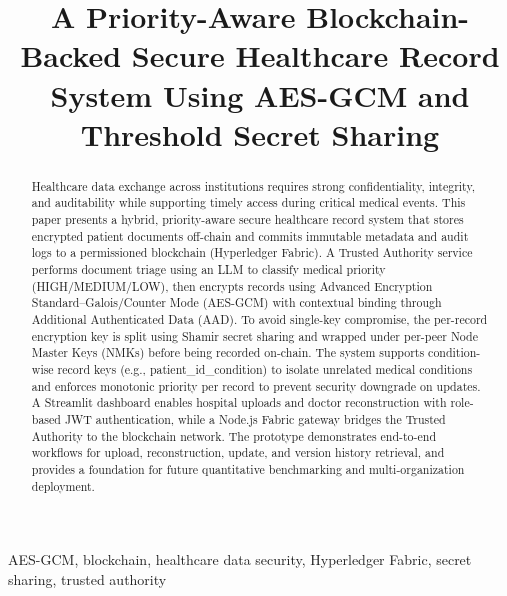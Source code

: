 \documentclass{IEEEtran}
\begin{document}
\title{A Priority-Aware Blockchain-Backed Secure Healthcare Record System Using AES-GCM and Threshold Secret Sharing}
\author{
}

\maketitle

\begin{abstract}
Healthcare data exchange across institutions requires strong confidentiality, integrity, and auditability while supporting timely access during critical medical events. This paper presents a hybrid, priority-aware secure healthcare record system that stores encrypted patient documents off-chain and commits immutable metadata and audit logs to a permissioned blockchain (Hyperledger Fabric). A Trusted Authority service performs document triage using an LLM to classify medical priority (HIGH/MEDIUM/LOW), then encrypts records using Advanced Encryption Standard--Galois/Counter Mode (AES-GCM) with contextual binding through Additional Authenticated Data (AAD). To avoid single-key compromise, the per-record encryption key is split using Shamir secret sharing and wrapped under per-peer Node Master Keys (NMKs) before being recorded on-chain. The system supports condition-wise record keys (e.g., patient\_id\_condition) to isolate unrelated medical conditions and enforces monotonic priority per record to prevent security downgrade on updates. A Streamlit dashboard enables hospital uploads and doctor reconstruction with role-based JWT authentication, while a Node.js Fabric gateway bridges the Trusted Authority to the blockchain network. The prototype demonstrates end-to-end workflows for upload, reconstruction, update, and version history retrieval, and provides a foundation for future quantitative benchmarking and multi-organization deployment.
\end{abstract}

\begin{IEEEkeywords}
AES-GCM, blockchain, healthcare data security, Hyperledger Fabric, secret sharing, trusted authority
\end{IEEEkeywords}
\end{document}
